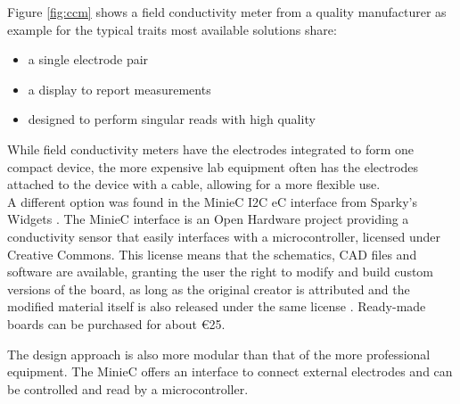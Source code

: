 Figure \ref{fig:ccm} shows a field conductivity meter from a quality manufacturer as example for the typical traits most available solutions share:
\begin{itemize}
	\item a single electrode pair
	\item a display to report measurements
	\item designed to perform singular reads with high quality
\end{itemize}

While field conductivity meters have the electrodes integrated to form one compact device, the more expensive lab equipment often has the electrodes attached to the device with a cable, allowing for a more flexible use. \\

A different option was found in the MinieC I2C eC interface from Sparky's Widgets \cite{uec}. The MinieC interface is an Open Hardware project providing a conductivity sensor that easily interfaces with a microcontroller, licensed under Creative Commons. This license means that the schematics, CAD files and software are available, granting the user the right to modify and build custom versions of the board, as long as the original creator is attributed and the modified material itself is also released under the same license \cite{cc}. Ready-made boards can be purchased for about \euro{25}.

The design approach is also more modular than that of the more professional equipment. The MinieC offers an interface to connect external electrodes and can be controlled and read by a microcontroller.